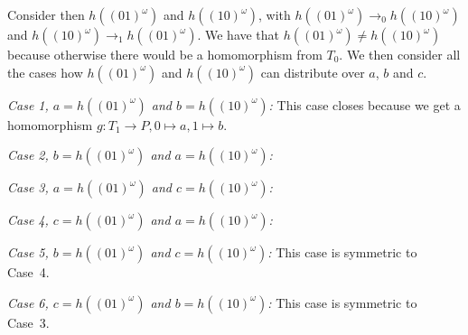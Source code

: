 \documentclass[a4paper]{article}
\newcommand{\case}[2]{\vspace{1ex}\noindent\textit{Case #1, #2:}}
\begin{document}
Consider then $h((01)^\omega)$ and $h((10)^\omega)$, with
$h((01)^\omega) \rightarrow_0 h((10)^\omega)$ and $h((10)^\omega)
\rightarrow_1 h((01)^\omega)$. We have that $h((01)^\omega) \neq
h((10)^\omega)$ because otherwise there would be a homomorphism from
$T_0$. We then consider all the cases how $h((01)^\omega)$ and
$h((10)^\omega)$ can distribute over $a$, $b$ and $c$.

\case{1}{$a = h((01)^\omega)$ and $b = h((10)^\omega)$} This case closes
because we get a homomorphism $g : T_1 \to P, 0 \mapsto a, 1 \mapsto b$.

\case{2}{$b = h((01)^\omega)$ and $a = h((10)^\omega)$}

\case{3}{$a = h((01)^\omega)$ and $c = h((10)^\omega)$}

\case{4}{$c = h((01)^\omega)$ and $a = h((10)^\omega)$}

\case{5}{$b = h((01)^\omega)$ and $c = h((10)^\omega)$} This case is
symmetric to Case~4.

\case{6}{$c = h((01)^\omega)$ and $b = h((10)^\omega)$} This case is
symmetric to Case~3.
\end{document}
